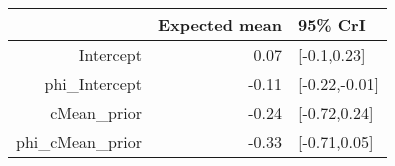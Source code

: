 \begin{tabular}{rrl}
  \hline
 & Expected mean & 95\% CrI \\ 
  \hline
Intercept & 0.07 & [-0.1,0.23] \\ 
  phi\_Intercept & -0.11 & [-0.22,-0.01] \\ 
  cMean\_prior & -0.24 & [-0.72,0.24] \\ 
  phi\_cMean\_prior & -0.33 & [-0.71,0.05] \\ 
   \hline
\end{tabular}

